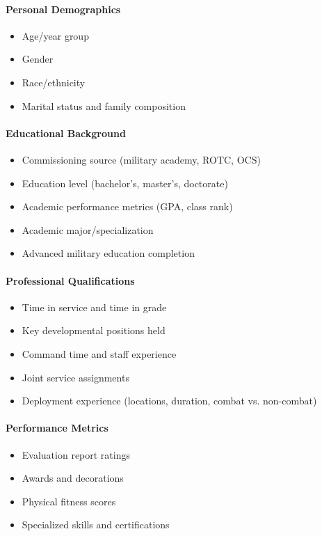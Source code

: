 \documentclass[../main.tex]{subfiles}
\begin{document}
\paragraph{Personal Demographics}
\begin{itemize}
\item Age/year group
\item Gender
\item Race/ethnicity
\item Marital status and family composition
\end{itemize}

\paragraph{Educational Background}
\begin{itemize}
\item Commissioning source (military academy, ROTC, OCS)
\item Education level (bachelor's, master's, doctorate)
\item Academic performance metrics (GPA, class rank)
\item Academic major/specialization
\item Advanced military education completion
\end{itemize}

\paragraph{Professional Qualifications}
\begin{itemize}
\item Time in service and time in grade
\item Key developmental positions held
\item Command time and staff experience
\item Joint service assignments
\item Deployment experience (locations, duration, combat vs. non-combat)
\end{itemize}

\paragraph{Performance Metrics}
\begin{itemize}
\item Evaluation report ratings
\item Awards and decorations
\item Physical fitness scores
\item Specialized skills and certifications
\end{itemize}
\end{document}
